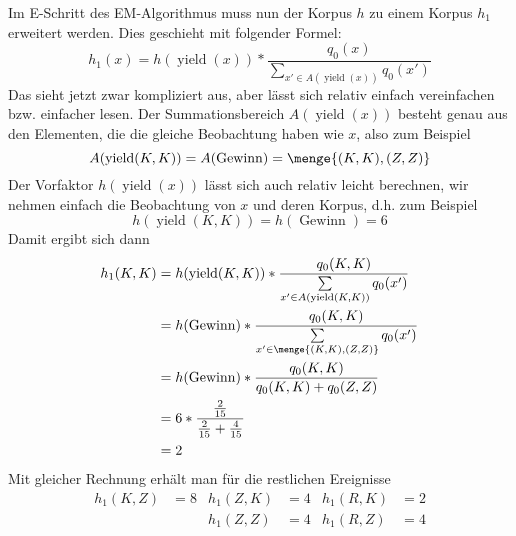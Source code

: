 \documentclass[ngerman, a4paper, 12pt]{article}
\DeclareMathOperator{\yield}{yield}
\DeclareMathOperator{\win}{Gewinn}
\begin{document}
\begin{enumerate}[label=(\alph*), leftmargin=0pt]
	Im E-Schritt des EM-Algorithmus muss nun der Korpus $h$ zu einem Korpus $h_1$ erweitert werden. Dies geschieht mit folgender Formel:
	\begin{equation*}
		h_1(x) = h(\yield(x)) * \frac{q_0(x)}{\sum\limits_{x' \in A(\yield(x))} q_0(x')}
	\end{equation*}
	Das sieht jetzt zwar kompliziert aus, aber lässt sich relativ einfach vereinfachen bzw. einfacher lesen. Der Summationsbereich $A(\yield(x))$ besteht genau aus den Elementen, die die gleiche Beobachtung haben wie $x$, also zum Beispiel
	\begin{equation*}
		A(\yield(K,K)) = A(\win) = \menge{(K,K), (Z,Z)}
	\end{equation*}
	Der Vorfaktor $h(\yield(x))$ lässt sich auch relativ leicht berechnen, wir nehmen einfach die Beobachtung von $x$ und deren Korpus, d.h. zum Beispiel
	\begin{equation*}
		h(\yield(K,K)) = h(\win) = 6
	\end{equation*}
	Damit ergibt sich dann
	\begin{align*}
		h_1(K,K) &= h(\yield(K,K)) * \frac{q_0(K,K)}{\sum\limits_{x' \in A(\yield(K,K))} q_0(x')} \\
		&= h(\win) * \frac{q_0(K,K)}{\sum\limits_{x' \in \menge{(K,K),(Z,Z)}} q_0(x')} \\
		&= h(\win) * \frac{q_0(K,K)}{q_0(K,K) + q_0(Z,Z)} \\
		&= 6 * \frac{\frac{2}{15}}{\frac{2}{15} + \frac{4}{15}} \\
		&= 2
	\end{align*}
	Mit gleicher Rechnung erhält man für die restlichen Ereignisse
	\begin{align*}
		h_1(K,Z) &= 8 & h_1(Z,K) &= 4 & h_1(R,K) &= 2 \\
				 &    & h_1(Z,Z) &= 4 & h_1(R,Z) &= 4
	\end{align*}
	


\end{enumerate}
\end{document}
